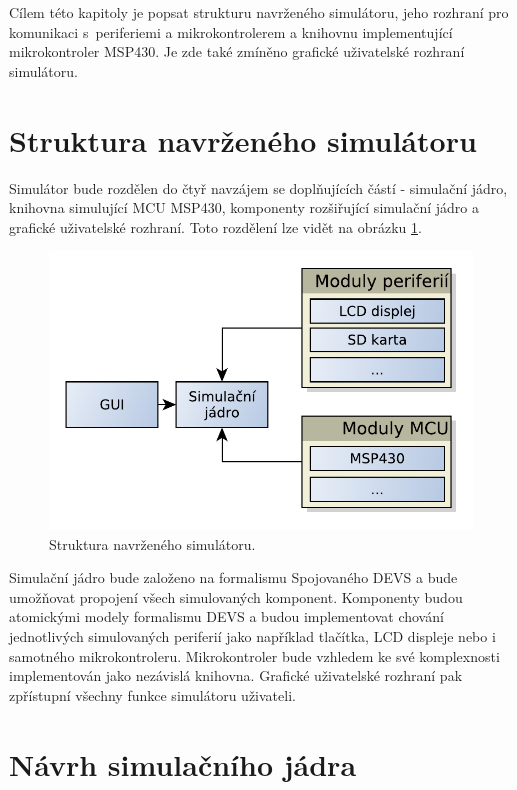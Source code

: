 Cílem této kapitoly je popsat strukturu navrženého simulátoru, jeho rozhraní pro komunikaci s~periferiemi a mikrokontrolerem a knihovnu implementující mikrokontroler MSP430. Je zde také zmíněno grafické uživatelské rozhraní simulátoru.

\section{Struktura navrženého simulátoru}

Simulátor bude rozdělen do čtyř navzájem se doplňujících částí - simulační jádro, knihovna simulující MCU MSP430, komponenty rozšiřující simulační jádro a grafické uživatelské rozhraní. Toto rozdělení lze vidět na obrázku \ref{fig:struktura}.

\begin{figure}[ht]
\centering
\includegraphics[trim=0cm 0cm 0cm 0cm, scale=0.7]{fig/struktura}
\caption{Struktura navrženého simulátoru.}
\label{fig:struktura}
\end{figure}

Simulační jádro bude založeno na formalismu Spojovaného DEVS a bude umožňovat propojení všech simulovaných komponent. Komponenty budou atomickými modely formalismu DEVS a budou implementovat chování jednotlivých simulovaných periferií jako například tlačítka, LCD displeje nebo i samotného mikrokontroleru. Mikrokontroler bude vzhledem ke své komplexnosti implementován jako nezávislá knihovna. Grafické uživatelské rozhraní pak zpřístupní všechny funkce simulátoru uživateli.

\section{Návrh simulačního jádra}

